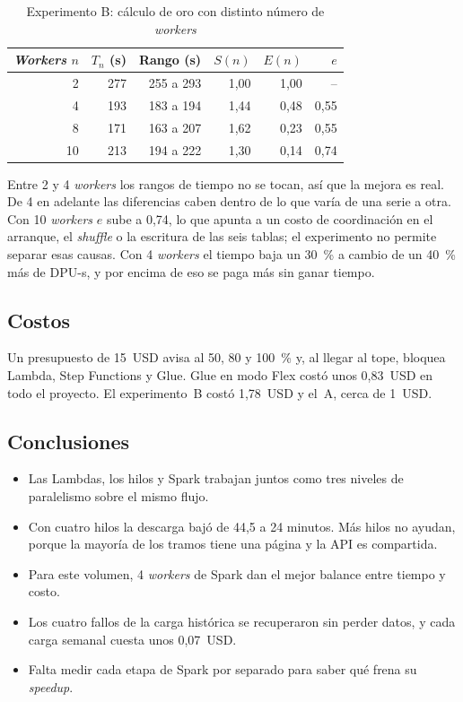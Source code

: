 \begin{table}[!htbp]
\caption{Experimento B: cálculo de oro con distinto número de \textit{workers}}
\label{cpd:tab:spark}
\centering
\begin{tabular}{@{}rrrrrr@{}}
\toprule
\textit{Workers} $n$ & $T_n$ (s) & Rango (s) & $S(n)$ & $E(n)$ & $e$ \\
\midrule
2 & 277 & 255 a 293 & 1,00 & 1,00 & -- \\
4 & 193 & 183 a 194 & 1,44 & 0,48 & 0,55 \\
8 & 171 & 163 a 207 & 1,62 & 0,23 & 0,55 \\
10 & 213 & 194 a 222 & 1,30 & 0,14 & 0,74 \\
\bottomrule
\end{tabular}
\end{table}

Entre 2 y 4 \textit{workers} los rangos de tiempo no se tocan, así que la mejora es real. De 4 en adelante las diferencias caben dentro de lo que varía de una serie a otra. Con 10 \textit{workers} $e$ sube a 0,74, lo que apunta a un costo de coordinación en el arranque, el \textit{shuffle} o la escritura de las seis tablas; el experimento no permite separar esas causas. Con 4 \textit{workers} el tiempo baja un 30~\% a cambio de un 40~\% más de DPU-s, y por encima de eso se paga más sin ganar tiempo.

\subsection{Costos}
Un presupuesto de 15~USD avisa al 50, 80 y 100~\% y, al llegar al tope, bloquea Lambda, Step Functions y Glue. Glue en modo Flex costó unos 0,83~USD en todo el proyecto. El experimento~B costó 1,78~USD y el~A, cerca de 1~USD.

\subsection{Conclusiones}
\begin{itemize}
  \item Las Lambdas, los hilos y Spark trabajan juntos como tres niveles de paralelismo sobre el mismo flujo.
  \item Con cuatro hilos la descarga bajó de 44,5 a 24 minutos. Más hilos no ayudan, porque la mayoría de los tramos tiene una página y la API es compartida.
  \item Para este volumen, 4 \textit{workers} de Spark dan el mejor balance entre tiempo y costo.
  \item Los cuatro fallos de la carga histórica se recuperaron sin perder datos, y cada carga semanal cuesta unos 0,07~USD.
  \item Falta medir cada etapa de Spark por separado para saber qué frena su \textit{speedup}.
\end{itemize}
